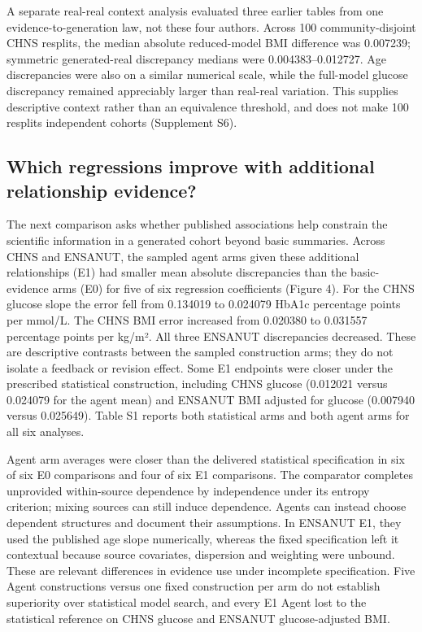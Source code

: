 \documentclass[11pt,letterpaper]{article}
\begin{document}
A separate real-real context analysis evaluated three earlier tables from one evidence-to-generation law, not these four authors. Across 100 community-disjoint CHNS resplits, the median absolute reduced-model BMI difference was 0.007239; symmetric generated-real discrepancy medians were 0.004383–\allowbreak{}0.012727. Age discrepancies were also on a similar numerical scale, while the full-model glucose discrepancy remained appreciably larger than real-real variation. This supplies descriptive context rather than an equivalence threshold, and does not make 100 resplits independent cohorts (Supplement S6).


\subsection{Which regressions improve with additional relationship evidence?}

The next comparison asks whether published associations help constrain the scientific information in a generated cohort beyond basic summaries. Across CHNS and ENSANUT, the sampled agent arms given these additional relationships (E1) had smaller mean absolute discrepancies than the basic-evidence arms (E0) for five of six regression coefficients (Figure 4). For the CHNS glucose slope the error fell from 0.134019 to 0.024079 HbA1c percentage points per mmol/\allowbreak{}L. The CHNS BMI error increased from 0.020380 to 0.031557 percentage points per kg/\allowbreak{}m². All three ENSANUT discrepancies decreased. These are descriptive contrasts between the sampled construction arms; they do not isolate a feedback or revision effect. Some E1 endpoints were closer under the prescribed statistical construction, including CHNS glucose (0.012021 versus 0.024079 for the agent mean) and ENSANUT BMI adjusted for glucose (0.007940 versus 0.025649). Table S1 reports both statistical arms and both agent arms for all six analyses.


Agent arm averages were closer than the delivered statistical specification in six of six E0 comparisons and four of six E1 comparisons. The comparator completes unprovided within-source dependence by independence under its entropy criterion; mixing sources can still induce dependence. Agents can instead choose dependent structures and document their assumptions. In ENSANUT E1, they used the published age slope numerically, whereas the fixed specification left it contextual because source covariates, dispersion and weighting were unbound. These are relevant differences in evidence use under incomplete specification. Five Agent constructions versus one fixed construction per arm do not establish superiority over statistical model search, and every E1 Agent lost to the statistical reference on CHNS glucose and ENSANUT glucose-adjusted BMI.
\end{document}
